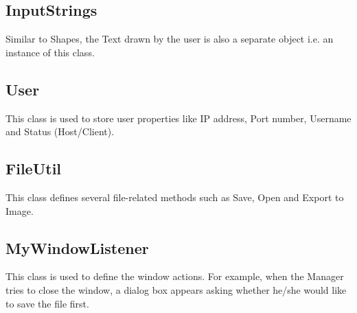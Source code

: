\subsection{InputStrings}
Similar to Shapes, the Text drawn by the user is also a separate object i.e. an instance of this class.

\subsection{User}
This class is used to store user properties like IP address, Port number, Username and Status (Host/Client).

\subsection{FileUtil}
This class defines several file-related methods such as Save, Open and Export to Image.

\subsection{MyWindowListener}
This class is used to define the window actions. For example, when the Manager tries to close the window, a dialog box appears asking whether he/she would like to save the file first.
